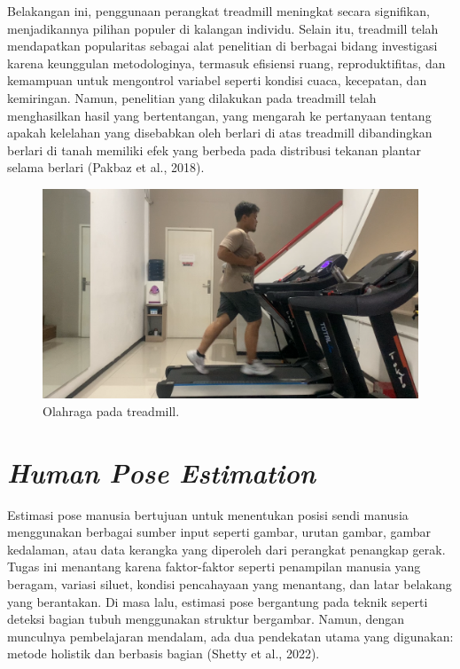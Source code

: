 Belakangan ini, penggunaan perangkat treadmill meningkat secara signifikan, menjadikannya pilihan populer di kalangan individu. Selain itu, treadmill telah mendapatkan popularitas sebagai alat penelitian di berbagai bidang investigasi karena keunggulan metodologinya, termasuk efisiensi ruang, reproduktifitas, dan kemampuan untuk mengontrol variabel seperti kondisi cuaca, kecepatan, dan kemiringan. Namun, penelitian yang dilakukan pada treadmill telah menghasilkan hasil yang bertentangan, yang mengarah ke pertanyaan tentang apakah kelelahan yang disebabkan oleh berlari di atas treadmill dibandingkan berlari di tanah memiliki efek yang berbeda pada distribusi tekanan plantar selama berlari (Pakbaz et al., 2018).

\begin{figure}[H]
  \centering
  \includegraphics[scale=0.28]{gambar/treadmill.png}
  \caption{Olahraga pada treadmill.}
  \label{fig:treadmillrun}
\end{figure}

\section{\emph{Human Pose Estimation}}
\label{sec:deteksigesturtubuh}

Estimasi pose manusia bertujuan untuk menentukan posisi sendi manusia menggunakan berbagai sumber input seperti gambar, urutan gambar, gambar kedalaman, atau data kerangka yang diperoleh dari perangkat penangkap gerak. Tugas ini menantang karena faktor-faktor seperti penampilan manusia yang beragam, variasi siluet, kondisi pencahayaan yang menantang, dan latar belakang yang berantakan. Di masa lalu, estimasi pose bergantung pada teknik seperti deteksi bagian tubuh menggunakan struktur bergambar. Namun, dengan munculnya pembelajaran mendalam, ada dua pendekatan utama yang digunakan: metode holistik dan berbasis bagian (Shetty et al., 2022).

